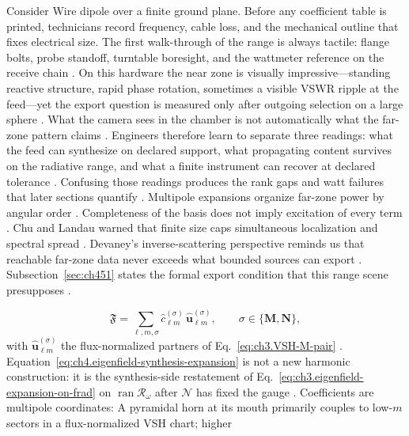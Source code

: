 \begin{physicalvignette}
Consider Wire dipole over a finite ground plane. Before any coefficient table is printed, technicians record frequency, cable loss, and the mechanical outline that fixes electrical size. The first walk-through of the range is always tactile: flange bolts, probe standoff, turntable boresight, and the wattmeter reference on the receive chain \cite{hansen1988}.
On this hardware the near zone is visually impressive---standing reactive structure, rapid phase rotation, sometimes a visible VSWR ripple at the feed---yet the export question is measured only after outgoing selection on a large sphere \cite{harrington2001}. What the camera sees in the chamber is not automatically what the far-zone pattern claims \cite{stratton1941}.
Engineers therefore learn to separate three readings: what the feed can synthesize on declared support, what propagating content survives on the radiative range, and what a finite instrument can recover at declared tolerance \cite{devaney2004}. Confusing those readings produces the rank gaps and watt failures that later sections quantify \cite{pal2026}.
Multipole expansions organize far-zone power by angular order . Completeness of the basis does not imply excitation of every term .
Chu and Landau warned that finite size caps simultaneous localization and spectral spread \cite{chu1948}. Devaney's inverse-scattering perspective reminds us that reachable far-zone data never exceeds what bounded sources can export \cite{devaney2004}.
Subsection~\ref{sec:ch451} states the formal export condition that this range scene presupposes \cite{stratton1941}.
\end{physicalvignette}
\begin{equation}
\label{eq:ch4.eigenfield-synthesis-expansion}
\mathfrak{F}
=
\sum_{\ell,m,\sigma}
\widehat{c}_{\ell m}^{(\sigma)}\,
\widehat{\mathbf{u}}_{\ell m}^{(\sigma)},
\qquad
\sigma\in\{\mathbf{M},\mathbf{N}\},
\end{equation}
with \(\widehat{\mathbf{u}}_{\ell m}^{(\sigma)}\) the flux-normalized partners of
Eq.~\eqref{eq:ch3.VSH-M-pair} \cite{hansen1988}. Equation~\eqref{eq:ch4.eigenfield-synthesis-expansion}
is not a new harmonic construction: it is the synthesis-side restatement of
Eq.~\eqref{eq:ch3.eigenfield-expansion-on-frad} on \(\operatorname{ran}\mathcal{R}_\omega\) after
\(\mathcal{N}\) has fixed the gauge \cite{stratton1941}. Coefficients are multipole coordinates:
A pyramidal horn at its mouth primarily couples to low-$m$ sectors in a flux-normalized VSH chart; higher
